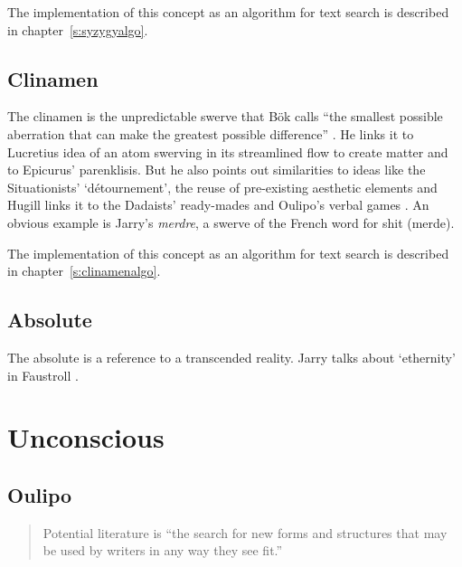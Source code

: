 The implementation of this concept as an algorithm for text search is described in chapter~\ref{s:syzygyalgo}.


\subsection{Clinamen}
\label{s:clinamen}

The clinamen is the unpredictable swerve that Bök calls ``the smallest possible aberration that can make the greatest possible difference'' \autocite*{Bok2002}. He links it to Lucretius idea of an atom swerving in its streamlined flow to create matter and to Epicurus' parenklisis. But he also points out similarities to ideas like the Situationists' `détournement', the reuse of pre-existing aesthetic elements and Hugill links it to the Dadaists' ready-mades and Oulipo's verbal games \autocite*{Hugill2012}. An obvious example is Jarry's \textit{merdre}, a swerve of the French word for shit (merde).

The implementation of this concept as an algorithm for text search is described in chapter~\ref{s:clinamenalgo}.


\subsection{Absolute}
\label{s:absolute}

The absolute is a reference to a transcended reality. Jarry talks about `ethernity' in Faustroll \autocite*{Jarry1996}.


\section{Unconscious}

\subsection{Oulipo}
\label{s:patalipo}

\begin{quotation}
  Potential literature is ``the search for new forms and structures that may be used by writers in any way they see fit.'' 
\end{quotation}


